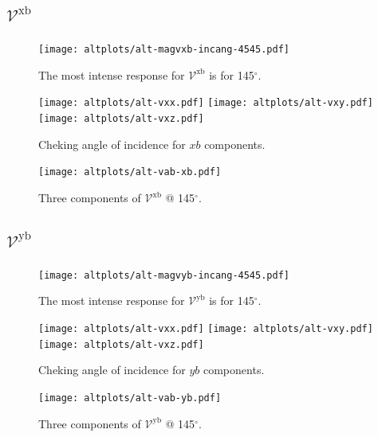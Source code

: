 \documentclass{article}
\let\Oldsubsection\subsection
\renewcommand{\subsection}{\FloatBarrier\Oldsubsection}
\begin{document}
\subsection{$\mathcal{V}^{\mathrm{xb}}$}
\begin{figure}[h!]
    \centering
    \texttt{[image: altplots/alt-magvxb-incang-4545.pdf]}
    \caption{The most intense response for $\mathcal{V}^{\mathrm{xb}} $ is for 
    145$^{\circ}$.}
    \label{fig:alt-magvxbincang}
\end{figure}
\begin{figure}[h!]
    \centering
    \texttt{[image: altplots/alt-vxx.pdf]}
    \texttt{[image: altplots/alt-vxy.pdf]}\\
    \texttt{[image: altplots/alt-vxz.pdf]}
    \caption{Cheking angle of incidence for $xb$ components.}
    \label{fig:alt-xbangcomp}
\end{figure}
\begin{figure}[t!]
    \centering
    \texttt{[image: altplots/alt-vab-xb.pdf]}
    \caption{Three components of $\mathcal{V}^{\mathrm{xb}} $ @ 145$^{\circ}$.}
    \label{fig:alt-vxb1}
\end{figure}


\subsection{$\mathcal{V}^{\mathrm{yb}}$}
\begin{figure}[h]
    \centering
    \texttt{[image: altplots/alt-magvyb-incang-4545.pdf]}
    \caption{The most intense response for $\mathcal{V}^{\mathrm{yb}} $ is for 
    145$^{\circ}$.}
    \label{fig:alt-magvybincang1}
\end{figure}
\begin{figure}[ht]
    \centering
    \texttt{[image: altplots/alt-vxx.pdf]}
    \texttt{[image: altplots/alt-vxy.pdf]}\\
    \texttt{[image: altplots/alt-vxz.pdf]}
    \caption{Cheking angle of incidence for $yb$ components.}
    \label{fig:alt-ybangcomp}
\end{figure}
\begin{figure}[ht]
    \centering
    \texttt{[image: altplots/alt-vab-yb.pdf]}
    \caption{Three components of $\mathcal{V}^{\mathrm{yb}} $ @ 145$^{\circ}$.}
    \label{fig:alt-vyb1}
\end{figure}
\end{document}
